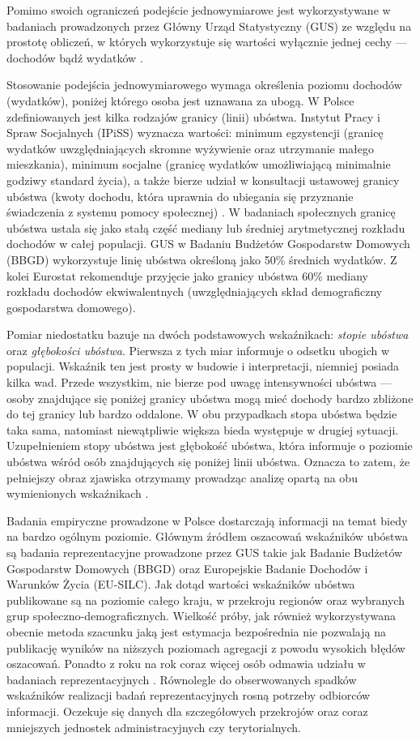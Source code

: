 Pomimo swoich ograniczeń podejście jednowymiarowe jest wykorzystywane w badaniach prowadzonych przez Główny Urząd Statystyczny (GUS) ze względu na prostotę obliczeń, w których wykorzystuje się wartości wyłącznie jednej cechy --- dochodów bądź wydatków \citep{ubostwo-gus2013}. 

Stosowanie podejścia jednowymiarowego wymaga określenia poziomu dochodów (wydatków), poniżej którego osoba jest uznawana za ubogą. W Polsce zdefiniowanych jest kilka rodzajów granicy (linii) ubóstwa. Instytut Pracy i Spraw Socjalnych (IPiSS) wyznacza wartości: minimum egzystencji (granicę wydatków uwzględniających skromne wyżywienie oraz utrzymanie małego mieszkania), minimum socjalne (granicę wydatków umożliwiającą minimalnie godziwy standard życia), a także bierze udział w konsultacji ustawowej granicy ubóstwa (kwoty dochodu, która uprawnia do ubiegania się przyznanie świadczenia z systemu pomocy społecznej) \citep{kurowski2002}. W badaniach społecznych granicę ubóstwa ustala się jako stałą część mediany lub średniej arytmetycznej rozkładu dochodów w całej populacji. GUS w Badaniu Budżetów Gospodarstw Domowych (BBGD) wykorzystuje linię ubóstwa określoną jako 50\% średnich wydatków. Z kolei Eurostat rekomenduje przyjęcie jako granicy ubóstwa 60\% mediany rozkładu dochodów ekwiwalentnych (uwzględniających skład demograficzny gospodarstwa domowego). 

Pomiar niedostatku bazuje na dwóch podstawowych wskaźnikach: \textit{stopie ubóstwa} oraz \textit{głębokości ubóstwa}. Pierwsza z tych miar informuje o odsetku ubogich w populacji. Wskaźnik ten jest prosty w budowie i interpretacji, niemniej posiada kilka wad. Przede wszystkim, nie bierze pod uwagę intensywności ubóstwa --- osoby znajdujące się poniżej granicy ubóstwa mogą mieć dochody bardzo zbliżone do tej granicy lub bardzo oddalone. W obu przypadkach stopa ubóstwa będzie taka sama, natomiast niewątpliwie większa bieda występuje w drugiej sytuacji. Uzupełnieniem stopy ubóstwa jest głębokość ubóstwa, która informuje o poziomie ubóstwa wśród osób znajdujących się poniżej linii ubóstwa. Oznacza to zatem, że pełniejszy obraz zjawiska otrzymamy prowadząc analizę opartą na obu wymienionych wskaźnikach \citep{haughton2009}.

Badania empiryczne prowadzone w Polsce dostarczają informacji na temat biedy na bardzo ogólnym poziomie. Głównym źródłem oszacowań wskaźników ubóstwa są badania reprezentacyjne prowadzone przez GUS takie jak Badanie Budżetów Gospodarstw Domowych (BBGD) oraz Europejskie Badanie Dochodów i Warunków Życia (EU-SILC). Jak dotąd wartości wskaźników ubóstwa publikowane są na poziomie całego kraju, w przekroju regionów oraz wybranych grup społeczno-demograficznych. Wielkość próby, jak również wykorzystywana obecnie metoda szacunku jaką jest estymacja bezpośrednia nie pozwalają na publikację wyników na niższych poziomach agregacji z powodu wysokich błędów oszacowań. Ponadto z roku na rok coraz więcej osób odmawia udziału w badaniach reprezentacyjnych \citep{dezagregacja2015}. Równolegle do obserwowanych spadków wskaźników realizacji badań reprezentacyjnych rosną potrzeby odbiorców informacji. Oczekuje się danych dla szczegółowych przekrojów oraz coraz mniejszych jednostek administracyjnych czy terytorialnych.

